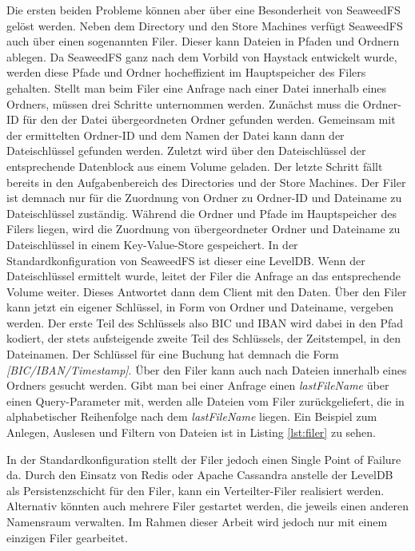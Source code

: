 \documentclass[12pt,oneside,a4paper,parskip]{scrbook}
\begin{document}
Die ersten beiden Probleme können aber über eine Besonderheit von SeaweedFS gelöst werden. Neben dem Directory und den Store Machines verfügt SeaweedFS auch über einen sogenannten Filer. Dieser kann Dateien in Pfaden und Ordnern ablegen. Da SeaweedFS ganz nach dem Vorbild von Haystack entwickelt wurde, werden diese Pfade und Ordner hocheffizient im Hauptspeicher des Filers gehalten. Stellt man beim Filer eine Anfrage nach einer Datei innerhalb eines Ordners, müssen drei Schritte unternommen werden. Zunächst muss die Ordner-ID für den der Datei übergeordneten Ordner gefunden werden. Gemeinsam mit der ermittelten Ordner-ID und dem Namen der Datei kann dann der Dateischlüssel gefunden werden. Zuletzt wird über den Dateischlüssel der entsprechende Datenblock aus einem Volume geladen. Der letzte Schritt fällt bereits in den Aufgabenbereich des Directories und der Store Machines. Der Filer ist demnach nur für die Zuordnung von Ordner zu Ordner-ID und Dateiname zu Dateischlüssel zuständig. Während die Ordner und Pfade im Hauptspeicher des Filers liegen, wird die Zuordnung von übergeordneter Ordner und Dateiname zu Dateischlüssel in einem Key-Value-Store gespeichert. In der Standardkonfiguration von SeaweedFS ist dieser eine LevelDB. Wenn der Dateischlüssel ermittelt wurde, leitet der Filer die Anfrage an das entsprechende Volume weiter. Dieses Antwortet dann dem Client mit den Daten.
Über den Filer kann jetzt ein eigener Schlüssel, in Form von Ordner und Dateiname, vergeben werden. Der erste Teil des Schlüssels also BIC und IBAN wird dabei in den Pfad kodiert, der stets aufsteigende  zweite Teil des Schlüssels, der Zeitstempel, in den Dateinamen. Der Schlüssel für eine Buchung hat demnach die Form \textit{[BIC/IBAN/Timestamp]}. Über den Filer kann auch nach Dateien innerhalb eines Ordners gesucht werden. Gibt man bei einer Anfrage einen \textit{lastFileName} über einen Query-Parameter mit, werden alle Dateien vom Filer zurückgeliefert, die in alphabetischer Reihenfolge nach dem \textit{lastFileName} liegen. Ein Beispiel zum Anlegen, Auslesen und Filtern von Dateien ist in Listing \ref{lst:filer} zu sehen.

In der Standardkonfiguration stellt der Filer jedoch einen Single Point of Failure da. Durch den Einsatz von Redis oder Apache Cassandra anstelle der LevelDB als Persistenzschicht für den Filer, kann ein Verteilter-Filer realisiert werden. Alternativ könnten auch mehrere Filer gestartet werden, die jeweils einen anderen Namensraum verwalten. Im Rahmen dieser Arbeit wird jedoch nur mit einem einzigen Filer gearbeitet.
\end{document}
